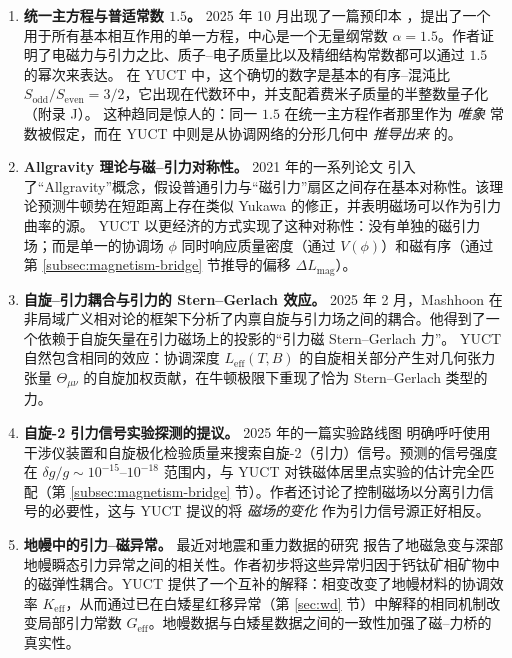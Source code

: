 \documentclass[12pt]{article}
\theoremstyle{remark}
\begin{document}
	\begin{enumerate}
		
		\item \textbf{统一主方程与普适常数 $1.5$。}
		2025 年 10 月出现了一篇预印本 \cite{UnifiedMaster2025}，提出了一个用于所有基本相互作用的单一方程，中心是一个无量纲常数 $\alpha = 1.5$。作者证明了电磁力与引力之比、质子–电子质量比以及精细结构常数都可以通过 $1.5$ 的幂次来表达。
		在 YUCT 中，这个确切的数字是基本的有序–混沌比 $S_{\mathrm{odd}}/S_{\mathrm{even}} = 3/2$，它出现在代数环中，并支配着费米子质量的半整数量子化（附录 J）。
		这种趋同是惊人的：同一 $1.5$ 在统一主方程作者那里作为 \emph{唯象} 常数被假定，而在 YUCT 中则是从协调网络的分形几何中 \emph{推导出来} 的。
		
		\item \textbf{Allgravity 理论与磁–引力对称性。}
		2021 年的一系列论文 \cite{Allgravity2021} 引入了“Allgravity”概念，假设普通引力与“磁引力”扇区之间存在基本对称性。该理论预测牛顿势在短距离上存在类似 Yukawa 的修正，并表明磁场可以作为引力曲率的源。
		YUCT 以更经济的方式实现了这种对称性：没有单独的磁引力场；而是单一的协调场 $\phi$ 同时响应质量密度（通过 $V(\phi)$）和磁有序（通过第 \ref{subsec:magnetism-bridge} 节推导的偏移 $\Delta L_{\mathrm{mag}}$）。
		
		\item \textbf{自旋–引力耦合与引力的 Stern–Gerlach 效应。}
		2025 年 2 月，Mashhoon \cite{Mashhoon2025} 在非局域广义相对论的框架下分析了内禀自旋与引力场之间的耦合。他得到了一个依赖于自旋矢量在引力磁场上的投影的“引力磁 Stern–Gerlach 力”。
		YUCT 自然包含相同的效应：协调深度 $L_{\mathrm{eff}}(T,B)$ 的自旋相关部分产生对几何张力张量 $\Theta_{\mu\nu}$ 的自旋加权贡献，在牛顿极限下重现了恰为 Stern–Gerlach 类型的力。
		
		\item \textbf{自旋-2 引力信号实验探测的提议。}
		2025 年的一篇实验路线图 \cite{Spin2Proposal2025} 明确呼吁使用干涉仪装置和自旋极化检验质量来搜索自旋-2（引力）信号。预测的信号强度在 $\delta g / g \sim 10^{-15}$--$10^{-18}$ 范围内，与 YUCT 对铁磁体居里点实验的估计完全匹配（第 \ref{subsec:magnetism-bridge} 节）。作者还讨论了控制磁场以分离引力信号的必要性，这与 YUCT 提议的将 \emph{磁场的变化} 作为引力信号源正好相反。
		
		\item \textbf{地幔中的引力–磁异常。}
		最近对地震和重力数据的研究 \cite{MantleGM2025} 报告了地磁急变与深部地幔瞬态引力异常之间的相关性。作者初步将这些异常归因于钙钛矿相矿物中的磁弹性耦合。YUCT 提供了一个互补的解释：相变改变了地幔材料的协调效率 $K_{\mathrm{eff}}$，从而通过已在白矮星红移异常（第 \ref{sec:wd} 节）中解释的相同机制改变局部引力常数 $G_{\mathrm{eff}}$。地幔数据与白矮星数据之间的一致性加强了磁–力桥的真实性。
		
	\end{enumerate}
	
\end{document}
